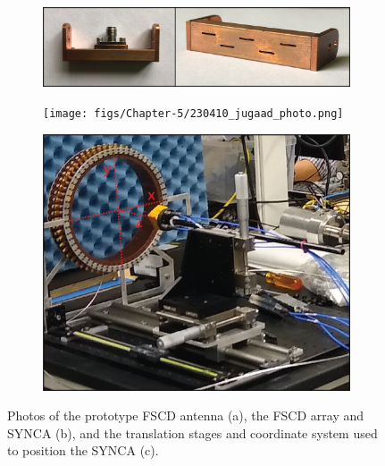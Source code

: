 \begin{figure}[htbp]
    \centering
    \begin{subfigure}{0.7\textwidth}
        \centering
        \includegraphics[width=\textwidth]{figs/Chapter-5/230502_slot_antenna.png}
        \caption{}
        \label{fig:jugaad_antenna_photo}
    \end{subfigure}
    \par\medskip
    \begin{subfigure}{0.7\textwidth}
        \centering
        \texttt{[image: figs/Chapter-5/230410\_jugaad\_photo.png]}
        \caption{}
        \label{fig:jugaad_photo}
    \end{subfigure}
    \par\medskip
    \begin{subfigure}{0.7\textwidth}
        \centering
        \includegraphics[width=\textwidth]{figs/Chapter-5/230502_jugaad_positioning_system.png}
        \caption{}
        \label{fig:jugaad_positioning_system}
    \end{subfigure}
    \caption{Photos of the prototype FSCD antenna (a), the FSCD array and SYNCA (b), and the translation stages and coordinate system used to position the SYNCA (c).}
    \label{fig:fscd_array_setup}
\end{figure}

